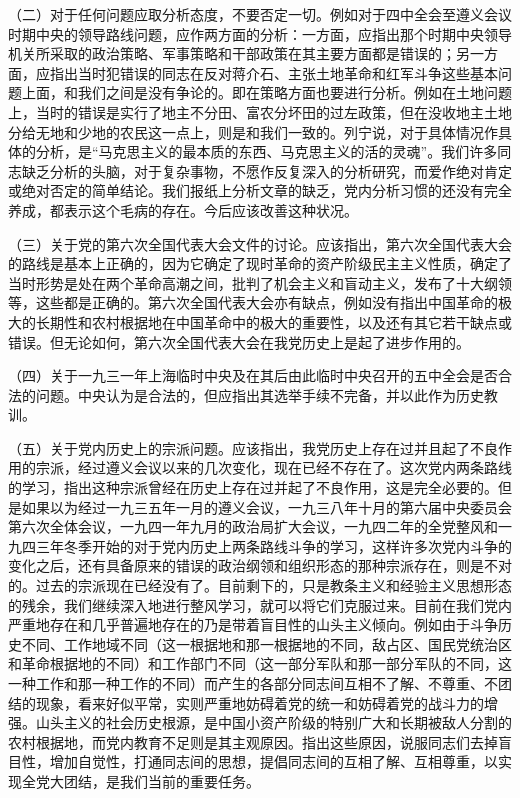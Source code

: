 （二）对于任何问题应取分析态度，不要否定一切。例如对于四中全会至遵义会议时期中央的领导路线问题，应作两方面的分析：一方面，应指出那个时期中央领导机关所采取的政治策略、军事策略和干部政策在其主要方面都是错误的；另一方面，应指出当时犯错误的同志在反对蒋介石、主张土地革命和红军斗争这些基本问题上面，和我们之间是没有争论的。即在策略方面也要进行分析。例如在土地问题上，当时的错误是实行了地主不分田、富农分坏田的过左政策，但在没收地主土地分给无地和少地的农民这一点上，则是和我们一致的。列宁说，对于具体情况作具体的分析，是“马克思主义的最本质的东西、马克思主义的活的灵魂”。我们许多同志缺乏分析的头脑，对于复杂事物，不愿作反复深入的分析研究，而爱作绝对肯定或绝对否定的简单结论。我们报纸上分析文章的缺乏，党内分析习惯的还没有完全养成，都表示这个毛病的存在。今后应该改善这种状况。

（三）关于党的第六次全国代表大会文件的讨论。应该指出，第六次全国代表大会的路线是基本上正确的，因为它确定了现时革命的资产阶级民主主义性质，确定了当时形势是处在两个革命高潮之间，批判了机会主义和盲动主义，发布了十大纲领等，这些都是正确的。第六次全国代表大会亦有缺点，例如没有指出中国革命的极大的长期性和农村根据地在中国革命中的极大的重要性，以及还有其它若干缺点或错误。但无论如何，第六次全国代表大会在我党历史上是起了进步作用的。

（四）关于一九三一年上海临时中央及在其后由此临时中央召开的五中全会是否合法的问题。中央认为是合法的，但应指出其选举手续不完备，并以此作为历史教训。

（五）关于党内历史上的宗派问题。应该指出，我党历史上存在过并且起了不良作用的宗派，经过遵义会议以来的几次变化，现在已经不存在了。这次党内两条路线的学习，指出这种宗派曾经在历史上存在过并起了不良作用，这是完全必要的。但是如果以为经过一九三五年一月的遵义会议，一九三八年十月的第六届中央委员会第六次全体会议，一九四一年九月的政治局扩大会议，一九四二年的全党整风和一九四三年冬季开始的对于党内历史上两条路线斗争的学习，这样许多次党内斗争的变化之后，还有具备原来的错误的政治纲领和组织形态的那种宗派存在，则是不对的。过去的宗派现在已经没有了。目前剩下的，只是教条主义和经验主义思想形态的残余，我们继续深入地进行整风学习，就可以将它们克服过来。目前在我们党内严重地存在和几乎普遍地存在的乃是带着盲目性的山头主义倾向。例如由于斗争历史不同、工作地域不同（这一根据地和那一根据地的不同，敌占区、国民党统治区和革命根据地的不同）和工作部门不同（这一部分军队和那一部分军队的不同，这一种工作和那一种工作的不同）而产生的各部分同志间互相不了解、不尊重、不团结的现象，看来好似平常，实则严重地妨碍着党的统一和妨碍着党的战斗力的增强。山头主义的社会历史根源，是中国小资产阶级的特别广大和长期被敌人分割的农村根据地，而党内教育不足则是其主观原因。指出这些原因，说服同志们去掉盲目性，增加自觉性，打通同志间的思想，提倡同志间的互相了解、互相尊重，以实现全党大团结，是我们当前的重要任务。

